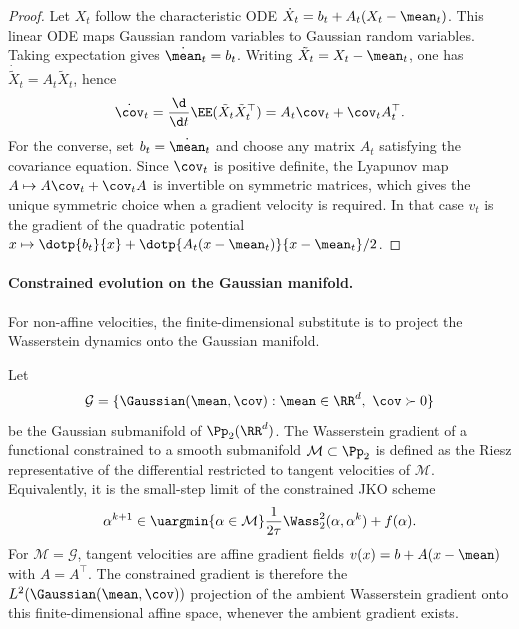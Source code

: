 \begin{proof}
	Let $X_t$ follow the characteristic ODE $\dot X_t=b_t+A_t(X_t-\mean_t)$. This linear ODE maps Gaussian random variables to Gaussian random variables. Taking expectation gives $\dot\mean_t=b_t$. Writing $\tilde X_t=X_t-\mean_t$, one has $\dot{\tilde X}_t=A_t\tilde X_t$, hence
	\[
		\dot\cov_t
		=
		\frac{\d}{\d t}\EE(\tilde X_t\tilde X_t^\top)
		=
		A_t\cov_t+\cov_t A_t^\top .
	\]
	For the converse, set $b_t=\dot\mean_t$ and choose any matrix $A_t$ satisfying the covariance equation. Since $\cov_t$ is positive definite, the Lyapunov map $A\mapsto A\cov_t+\cov_t A$ is invertible on symmetric matrices, which gives the unique symmetric choice when a gradient velocity is required. In that case $v_t$ is the gradient of the quadratic potential $x\mapsto \dotp{b_t}{x}+\dotp{A_t(x-\mean_t)}{x-\mean_t}/2$.
\end{proof}

\paragraph{Constrained evolution on the Gaussian manifold.}

For non-affine velocities, the finite-dimensional substitute is to project the Wasserstein dynamics onto the Gaussian manifold.

Let
\[
	\mathcal G=\{\Gaussian(\mean,\cov):\mean\in\RR^d,\ \cov\succ0\}
\]
be the Gaussian submanifold of $\Pp_2(\RR^d)$. The Wasserstein gradient of a functional constrained to a smooth submanifold $\mathcal M\subset\Pp_2$ is defined as the Riesz representative of the differential restricted to tangent velocities of $\mathcal M$. Equivalently, it is the small-step limit of the constrained JKO scheme
\[
	\alpha^{k+1}\in
	\uargmin{\alpha\in\mathcal M}
	\frac{1}{2\tau}\Wass_2^2(\alpha,\alpha^k)+f(\alpha).
\]
For $\mathcal M=\mathcal G$, tangent velocities are affine gradient fields $v(x)=b+A(x-\mean)$ with $A=A^\top$. The constrained gradient is therefore the $L^2(\Gaussian(\mean,\cov))$ projection of the ambient Wasserstein gradient onto this finite-dimensional affine space, whenever the ambient gradient exists.

